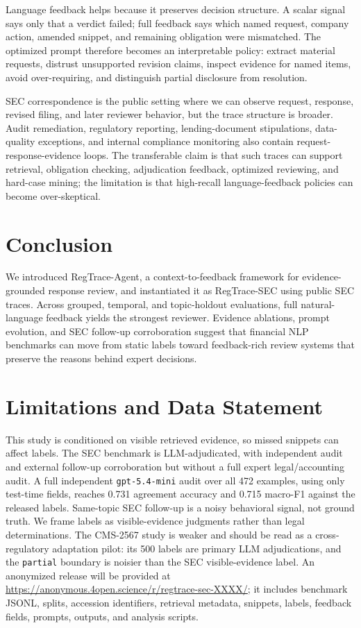 \documentclass[11pt]{article}
\newcommand{\dataset}{RegTrace-SEC}
\newcommand{\framework}{RegTrace-Agent}
\begin{document}
Language feedback helps because it preserves decision structure. A scalar signal says only that a verdict failed; full feedback says which named request, company action, amended snippet, and remaining obligation were mismatched. The optimized prompt therefore becomes an interpretable policy: extract material requests, distrust unsupported revision claims, inspect evidence for named items, avoid over-requiring, and distinguish partial disclosure from resolution.

SEC correspondence is the public setting where we can observe request, response, revised filing, and later reviewer behavior, but the trace structure is broader. Audit remediation, regulatory reporting, lending-document stipulations, data-quality exceptions, and internal compliance monitoring also contain request-response-evidence loops. The transferable claim is that such traces can support retrieval, obligation checking, adjudication feedback, optimized reviewing, and hard-case mining; the limitation is that high-recall language-feedback policies can become over-skeptical.

\section{Conclusion}

We introduced \framework{}, a context-to-feedback framework for evidence-grounded response review, and instantiated it as \dataset{} using public SEC traces. Across grouped, temporal, and topic-holdout evaluations, full natural-language feedback yields the strongest reviewer. Evidence ablations, prompt evolution, and SEC follow-up corroboration suggest that financial NLP benchmarks can move from static labels toward feedback-rich review systems that preserve the reasons behind expert decisions.

\section*{Limitations and Data Statement}

This study is conditioned on visible retrieved evidence, so missed snippets can affect labels. The SEC benchmark is LLM-adjudicated, with independent audit and external follow-up corroboration but without a full expert legal/accounting audit. A full independent \texttt{gpt-5.4-mini} audit over all 472 examples, using only test-time fields, reaches 0.731 agreement accuracy and 0.715 macro-F1 against the released labels. Same-topic SEC follow-up is a noisy behavioral signal, not ground truth. We frame labels as visible-evidence judgments rather than legal determinations. The CMS-2567 study is weaker and should be read as a cross-regulatory adaptation pilot: its 500 labels are primary LLM adjudications, and the \texttt{partial} boundary is noisier than the SEC visible-evidence label. An anonymized release will be provided at \url{https://anonymous.4open.science/r/regtrace-sec-XXXX/}; it includes benchmark JSONL, splits, accession identifiers, retrieval metadata, snippets, labels, feedback fields, prompts, outputs, and analysis scripts.
\end{document}
